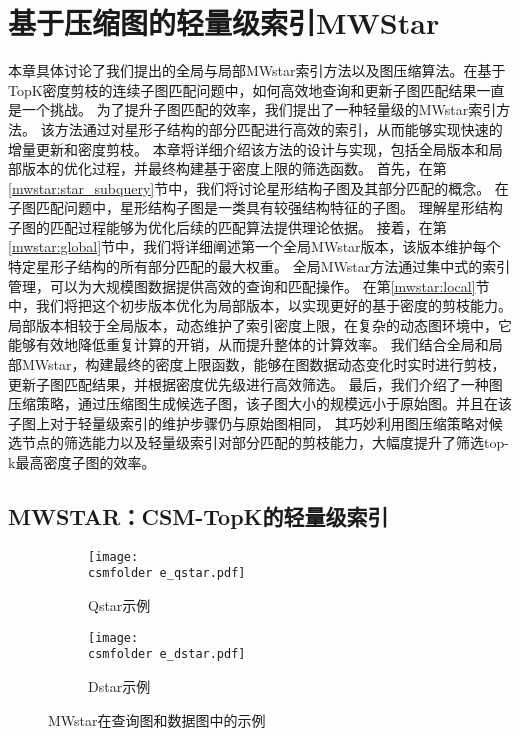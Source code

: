 \chapter{基于压缩图的轻量级索引MWStar}
\label{ch4}
本章具体讨论了我们提出的全局与局部MWstar索引方法以及图压缩算法。在基于TopK密度剪枝的连续子图匹配问题中，如何高效地查询和更新子图匹配结果一直是一个挑战。
为了提升子图匹配的效率，我们提出了一种轻量级的MWstar索引方法。
该方法通过对星形子结构的部分匹配进行高效的索引，从而能够实现快速的增量更新和密度剪枝。
本章将详细介绍该方法的设计与实现，包括全局版本和局部版本的优化过程，并最终构建基于密度上限的筛选函数。
首先，在第\ref{mwstar:star_subquery}节中，我们将讨论星形结构子图及其部分匹配的概念。
在子图匹配问题中，星形结构子图是一类具有较强结构特征的子图。
理解星形结构子图的匹配过程能够为优化后续的匹配算法提供理论依据。
接着，在第\ref{mwstar:global}节中，我们将详细阐述第一个全局MWstar版本，该版本维护每个特定星形子结构的所有部分匹配的最大权重。
全局MWstar方法通过集中式的索引管理，可以为大规模图数据提供高效的查询和匹配操作。
在第\ref{mwstar:local}节中，我们将把这个初步版本优化为局部版本，以实现更好的基于密度的剪枝能力。
局部版本相较于全局版本，动态维护了索引密度上限，在复杂的动态图环境中，它能够有效地降低重复计算的开销，从而提升整体的计算效率。
我们结合全局和局部MWstar，构建最终的密度上限函数，能够在图数据动态变化时实时进行剪枝，更新子图匹配结果，并根据密度优先级进行高效筛选。
最后，我们介绍了一种图压缩策略，通过压缩图生成候选子图，该子图大小的规模远小于原始图。并且在该子图上对于轻量级索引的维护步骤仍与原始图相同，
其巧妙利用图压缩策略对候选节点的筛选能力以及轻量级索引对部分匹配的剪枝能力，大幅度提升了筛选top-k最高密度子图的效率。

\section{MWSTAR：CSM-TopK的轻量级索引}

\begin{figure}[h!]
\def\wscorevone{0.48}
\centering
\begin{subfigure}[t]{\wscorevone\linewidth}
\centering
\resizebox{\linewidth}{!}
{
\texttt{[image: \\csmfolder e\_qstar.pdf]}
}
\caption{Qstar示例}
\label{fig:qstar}
\end{subfigure}
\begin{subfigure}[t]{\wscorevone\linewidth}
\centering
\resizebox{\linewidth}{!}
{
\texttt{[image: \\csmfolder e\_dstar.pdf]}
}
\caption{Dstar示例}
\label{fig:dstar}
\end{subfigure}
\caption{MWstar在查询图和数据图中的示例}
\label{fig:exp:mwstar}
\end{figure}

